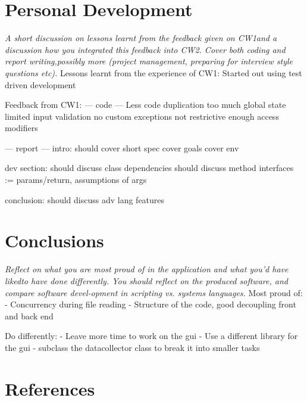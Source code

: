 \documentclass[11pt]{article}
\begin{document}
\section{Personal Development}
\emph{A short discussion on lessons learnt from the feedback given on CW1and a discussion how you integrated this feedback into CW2.  Cover both coding and report writing,possibly more (project management, preparing for interview style questions etc).}
Lessons learnt from the experience of CW1:
Started out using test driven development


Feedback from CW1:
 --- code ---
Less code duplication
too much global state
limited input validation
no custom exceptions
not restrictive enough access modifiers

--- report ---
intro:
    should cover short spec
    cover goals
    cover env

dev section:
    should discuss class dependencies
    should discuss method interfaces := params/return, assumptions of args

conclusion:
    should discuss adv lang features




\section{Conclusions}
\emph{Reflect on what you are most proud of in the application and what you’d have likedto have done differently.  You should reflect on the produced software, and compare software devel-opment in scripting vs.  systems languages.}
Most proud of:
- Concurrency during file reading
- Structure of the code, good decoupling front and back end

Do differently:
- Leave more time to work on the gui
- Use a different library for the gui
- subclass the datacollector class to break it into smaller tasks


\pagebreak
\appendix
\section{References}
\printbibliography
\end{document}
